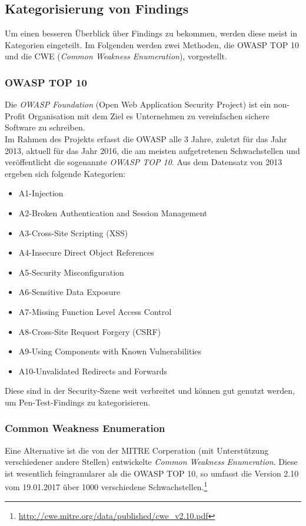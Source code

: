 	\subsection{Kategorisierung von Findings}
	Um einen besseren Überblick über Findings zu bekommen, werden diese meist in Kategorien eingeteilt. Im Folgenden werden zwei Methoden, die OWASP TOP 10 und die CWE (\textit{Common Weakness Enumeration}), vorgestellt.
	
		\subsubsection{OWASP TOP 10}
		Die \textit{OWASP Foundation} (Open Web Application Security Project) ist ein non-Profit Organisation mit dem Ziel es Unternehmen zu vereinfachen sichere Software zu schreiben.\\
		
		Im Rahmen des Projekts erfasst die OWASP alle 3 Jahre, zuletzt für das Jahr 2013, aktuell für das Jahr 2016, die am meisten aufgetretenen Schwachstellen und veröffentlicht die sogenannte \textit{OWASP TOP 10}. Aus dem Datensatz von 2013 ergeben sich folgende Kategorien\cite{OWASPTOP10}:
		\begin{itemize}
			\item A1-Injection
			\item A2-Broken Authentication and Session Management
			\item A3-Cross-Site Scripting (XSS)
			\item A4-Insecure Direct Object References
			\item A5-Security Misconfiguration
			\item A6-Sensitive Data Exposure
			\item A7-Missing Function Level Access Control
			\item A8-Cross-Site Request Forgery (CSRF)
			\item A9-Using Components with Known Vulnerabilities 
			\item A10-Unvalidated Redirects and Forwards
		\end{itemize}
		
		Diese sind in der Security-Szene weit verbreitet und können gut genutzt werden, um Pen-Test-Findings zu kategorisieren.
		
		\subsubsection{Common Weakness Enumeration}
		Eine Alternative ist die von der MITRE Corperation (mit Unterstützung verschiedener andere Stellen) entwickelte \textit{Common Weakness Enumeration}. Diese ist wesentlich feingranularer als die OWASP TOP 10, so umfasst die Version 2.10 vom 19.01.2017 über 1000 verschiedene Schwachstellen.\footnote{\url{http://cwe.mitre.org/data/published/cwe_v2.10.pdf}}\cite{MITRECWE}\\
		
